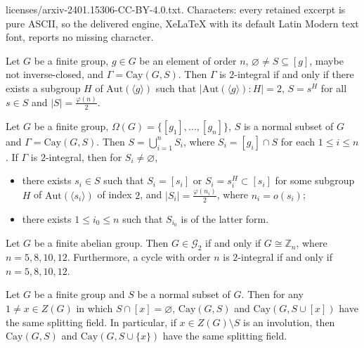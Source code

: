\documentclass[10pt,a4paper]{amsart}
\def \leq {\leqslant}
\begin{document}
licenses/arxiv-2401.15306-CC-BY-4.0.txt. Characters: every retained excerpt is pure ASCII, so the delivered engine, XeLaTeX with its default Latin Modern text font, reports no missing character.
	\begin{lem}\label{half}
		Let $G$ be a finite  group, $g\in G$ be an element of order $n$, $\varnothing\neq S\subseteq [g]$, maybe not inverse-closed,  and $\Gamma=\mathrm{Cay}(G,S)$. 
		Then $\Gamma$ is $2$-integral if and only if there exists a subgroup $H$ of $\mathrm{Aut}(\langle g\rangle)$ such that $|\mathrm{Aut}(\langle g\rangle):H|=2$, $S=s^H$ for all $s\in S$ and $|S|=\frac{\varphi(n)}{2}$.
	\end{lem}

	\begin{core}\label{asli}
		Let $G$ be a finite group, $\Omega(G)=\{[g_1],\ldots,[g_n]\}$, $S$ is a normal subset of $G$ and $\Gamma=\mathrm{Cay}(G,S)$.
		Then $S=\bigcup_{i=1}^{n}S_i$, where $S_i=[g_i]\cap S$ for each $1\leq i\leq n$.
		If $\Gamma$ is $2$-integral, then for $S_i\neq \varnothing$,
		\begin{itemize}
			\item [$(1)$]  there exists $s_i\in S$ such that $S_i=[s_i]$ or $S_i=s_i^H\subset [s_i]$ for some subgroup $H$ of $\mathrm{Aut}(\langle s_i\rangle)$ of index $2$, and $|S_i|=\frac{\varphi(n_i)}{2}$, where $n_i=o(s_i)$;
			\item[$(2)$] there exists $1\leq i_0\leq n$ such that $S_{i_0}$ is of the latter form. 
		\end{itemize}
	\end{core}

	\begin{thm}\label{2}
		Let $G$ be a finite abelian group. Then $G\in\mathcal{G}_2$ if and only if $G\cong\mathbb Z_n$, where $n=5,8,10,12$.
		Furthermore, a cycle with order $n$ is $2$-integral if and only if $n=5,8,10,12$.
	\end{thm}

	\begin{lem}\label{+1}
		Let $G$ be a finite group and $S$ be a normal subset of $G$.  Then for any $1\neq x\in Z(G)$ in which $S\cap [x]=\varnothing$, $\mathrm{Cay}(G,S)$ and $\mathrm{Cay}(G,S\cup [x])$ have the same splitting field. In particular, if $x\in Z(G)\setminus S$ is an involution, then $\mathrm{Cay}(G,S)$ and $\mathrm{Cay}(G,S\cup \{x\})$ have the same splitting field.
	\end{lem}
\end{document}
